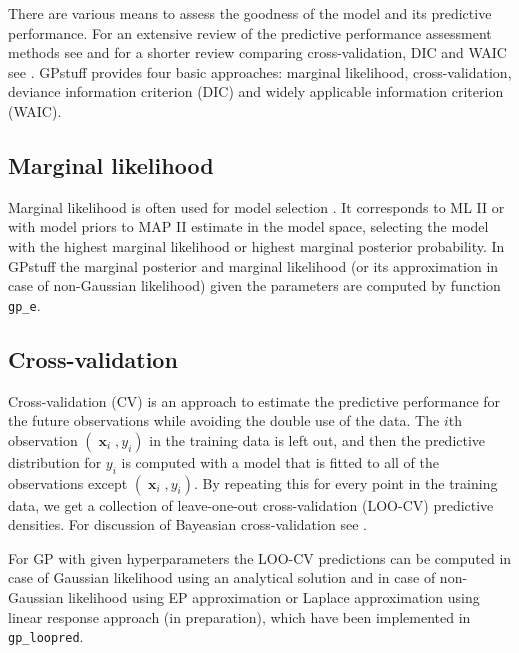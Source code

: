 \documentclass[twoside,11pt]{article}
\DeclareMathOperator{\x}{\mathbf{x}}
\newcommand{\pkg}[1]{{\fontseries{b}\selectfont #1}}
\newcommand{\code}[1]{{\normalfont\texttt{#1}}}
\begin{document}
There are various means to assess the goodness of the model and its
predictive performance. For an extensive review of the predictive
performance assessment methods see \citet{Vehtari+Ojanen:2012} and for
a shorter review comparing cross-validation, DIC and WAIC see
\citet{Gelman+Hwang+Vehtari:2013}. \pkg{GPstuff} provides four basic
approaches: marginal likelihood, cross-validation, deviance
information criterion (DIC) and widely applicable information
criterion (WAIC).

\subsection{Marginal likelihood}

Marginal likelihood is often used for model selection \citep[see,
e.g.][]{Kass+Raftery:1995}. It corresponds to ML II or with model
priors to MAP II estimate in the model space, selecting the model with
the highest marginal likelihood or highest marginal posterior
probability. 
%
In \pkg{GPstuff} the marginal posterior and marginal likelihood (or
its approximation in case of non-Gaussian likelihood) given the
parameters are computed by function \code{gp\_e}.

\subsection{Cross-validation}
\label{sec:cross-validation}

Cross-validation (CV) is an approach to estimate the predictive
performance for the future observations while avoiding the double use
of the data. The $i$th observation $(\x_{i},y_{i})$ in the training
data is left out, and then the predictive distribution for $y_i$ is
computed with a model that is fitted to all of the observations except
$(\x_i,y_i)$.
%
By repeating this for every point in the training data, we get a
collection of leave-one-out cross-validation (LOO-CV) predictive
densities.
%
For discussion of Bayeasian cross-validation see \citet{Vehtari+Lampinen:2002,Vehtari+Ojanen:2012,Gelman+Hwang+Vehtari:2013}.

For GP with given hyperparameters the LOO-CV predictions can be
computed in case of Gaussian likelihood using an analytical
solution \citep{Sundararajan+Keerthi:2001a} and in case of
non-Gaussian likelihood using EP approximation
\citep{Opper+Winther:2000,Rasmussen+Williams:2006} or Laplace
approximation using linear response approach (in preparation),
which have been implemented in \code{gp\_loopred}.
%
\end{document}
